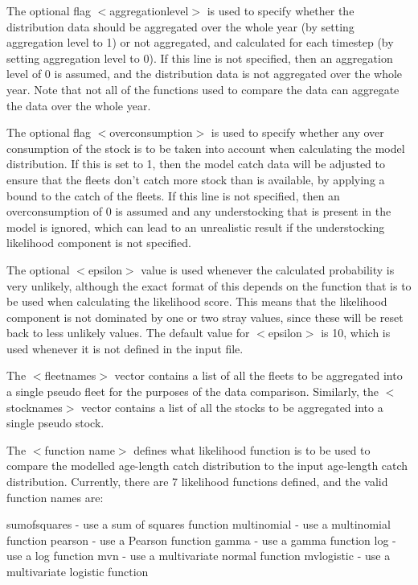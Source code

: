 \documentclass[10pt,twoside]{book}
\begin{document}
The optional flag $<$aggregationlevel$>$ is used to specify whether the distribution data should be aggregated over the whole year (by setting aggregation level to 1) or not aggregated, and calculated for each timestep (by setting aggregation level to 0).  If this line is not specified, then an aggregation level of 0 is assumed, and the distribution data is not aggregated over the whole year.  Note that not all of the functions used to compare the data can aggregate the data over the whole year.

\bigskip
The optional flag $<$overconsumption$>$ is used to specify whether any over consumption of the stock is to be taken into account when calculating the model distribution.  If this is set to 1, then the model catch data will be adjusted to ensure that the fleets don't catch more stock than is available, by applying a bound to the catch of the fleets.  If this line is not specified, then an overconsumption of 0 is assumed and any understocking that is present in the model is ignored, which can lead to an unrealistic result if the understocking likelihood component is not specified.

\bigskip
The optional $<$epsilon$>$ value is used whenever the calculated probability is very unlikely, although the exact format of this depends on the function that is to be used when calculating the likelihood score.  This means that the likelihood component is not dominated by one or two stray values, since these will be reset back to less unlikely values.  The default value for $<$epsilon$>$ is 10, which is used whenever it is not defined in the input file.

\bigskip
The $<$fleetnames$>$ vector contains a list of all the fleets to be aggregated into a single pseudo fleet for the purposes of the data comparison.  Similarly, the $<$stocknames$>$ vector contains a list of all the stocks to be aggregated into a single pseudo stock.

\bigskip
The $<$function name$>$ defines what likelihood function is to be used to compare the modelled age-length catch distribution to the input age-length catch distribution.  Currently, there are 7 likelihood functions defined, and the valid function names are:

\bigskip
sumofsquares - use a sum of squares function\newline
multinomial - use a multinomial function\newline
pearson - use a Pearson function\newline
gamma - use a gamma function\newline
log - use a log function\newline
mvn - use a multivariate normal function\newline
mvlogistic - use a multivariate logistic function
\end{document}
